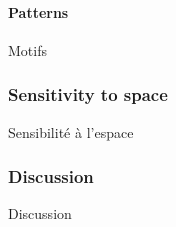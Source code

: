 



\paragraph{Patterns}{Motifs}






\subsubsection{Sensitivity to space}{Sensibilité à l'espace}












\subsubsection{Discussion}{Discussion}




















